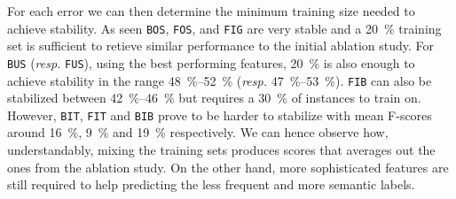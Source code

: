         For each error we can then determine the minimum training size needed to achieve stability.
        As seen \texttt{BOS}, \texttt{FOS}, and \texttt{FIG} are very stable and a \SI{20}{\percent} training set is sufficient to retieve similar performance to the initial ablation study.
        For \texttt{BUS} (\textit{resp.} \texttt{FUS}), using the best performing features, \SI{20}{\percent} is also enough to achieve stability in the range \SIrange{48}{52}{\percent} (\textit{resp.} \SIrange{47}{53}{\percent}).
        \texttt{FIB} can also be stabilized between \SIrange[range-phrase={ and }]{42}{46}{\percent} but requires a \SI{30}{\percent} of instances to train on.
        However, \texttt{BIT}, \texttt{FIT} and \texttt{BIB} prove to be harder to stabilize with mean F-scores around \SI{16}{\percent}, \SI{9}{\percent} and \SI{19}{\percent} respectively.
        We can hence observe how, understandably, mixing the training sets produces scores that averages out the ones from the ablation study.
        On the other hand, more sophisticated features are still required to help predicting the less frequent and more semantic labels.

